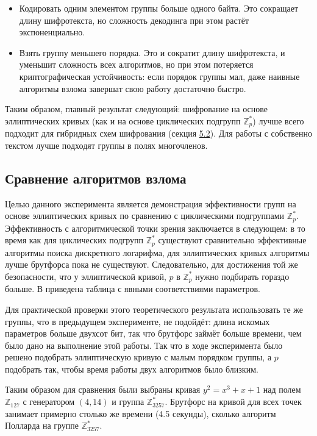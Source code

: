 \documentclass[a4paper,14pt]{extarticle}
\begin{document}
\begin{itemize}
    \item Кодировать одним элементом группы больше одного байта. Это сокращает
        длину шифротекста, но сложность декодинга при этом растёт
        экспоненциально.
    \item Взять группу меньшего порядка. Это и сократит длину шифротекста, и
        уменьшит сложность всех алгоритмов, но при этом потеряется
        криптографическая устойчивость: если порядок группы мал, даже наивные
        алгоритмы взлома завершат свою работу достаточно быстро.
\end{itemize}

Таким образом, главный результат следующий: шифрование на основе эллиптических
кривых (как и на основе циклических подгрупп $\mathbb{Z}_p^*$) лучше всего
подходит для гибридных схем шифрования (секция \hyperref[hybrid]{5.2}). Для работы с собственно
текстом лучше подходят группы в полях многочленов.

\subsection{Сравнение алгоритмов взлома}

Целью данного эксперимента является демонстрация эффективности групп на основе
эллиптических кривых по сравнению с циклическими подгруппами $\mathbb{Z}_p^*$.
Эффективность с алгоритмической точки зрения заключается в следующем: в то время
как для циклических подгрупп $\mathbb{Z}_p^*$ существуют сравнительно
эффективные алгоритмы поиска дискретного логарифма, для эллиптических кривых
алгоритмы лучше брутфорса пока не существуют. Следовательно, для достижения той
же безопасности, что у эллиптической кривой, $p$ в $\mathbb{Z}_p^*$ нужно
подбирать гораздо больше. В \cite{textbook} приведена таблица с явными соответствиями
параметров.

Для практической проверки этого теоретического результата использовать те же
группы, что в предыдущем эксперименте, не подойдёт: длина искомых параметров
больше двухсот бит, так что брутфорс займёт больше времени, чем было дано на
выполнение этой работы. Так что в ходе эксперимента было решено подобрать
эллиптическую кривую с малым порядком группы, а $p$ подобрать так, чтобы время
работы двух алгоритмов было близким.

Таким образом для сравнения были выбраны кривая $y^2 = x^3 + x + 1$ над полем
$\mathbb{Z}_{127}$ с генератором $(4, 14)$ и группа $\mathbb{Z}_{3257}^*$.
Брутфорс на кривой для всех точек занимает примерно столько же времени (4.5
секунды), сколько алгоритм Полларда на группе $\mathbb{Z}_{3257}^*$.

\newpage

\printbibliography[heading=bibintoc]
\end{document}
